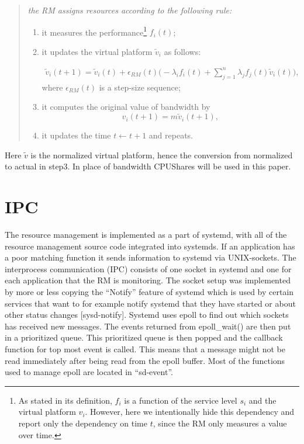 \documentclass[nobiblatex]{LTHthesis}
\begin{document}
\begin{quotation}
\em
	the RM assigns resources according to
	the following rule:
	\begin{enumerate}

	\item it measures the performance\footnote{As stated in its definition, $f_i$ is a function of the service level $s_i$ and the virtual platform $v_i$. However, here we intentionally hide this dependency and report only the dependency on time $t$, since the RM only measures a value over time.} $f_i(t)$;  
	\item it updates the virtual platform $\tilde{v}_{i}$ as follows:

		\begin{multline}
		  \tilde{v}_i(t+1) =\tilde{v}_i(t) + \epsilon_{ RM}(t)\Big(- \lambda_i f_i(t) + \sum_{j=1}^n \lambda_j f_j(t) \tilde{v}_i(t)\Big),
		  \label{eq:RecursionForResources}
		\end{multline}
		  where $\epsilon_{ RM}(t)$ is a step-size sequence;
	\item it computes the original value of bandwidth by $$v_i(t+1) = m \tilde{v}_i(t+1),$$
	\item it updates the time $t\leftarrow t+1$ and repeats.
	\end{enumerate}
	
	
\end{quotation}

Here $\tilde{v}$ is the normalized virtual platform, hence the conversion from normalized to actual in step3. In place of bandwidth CPUShares will be used in this paper.





\section{IPC}
The resource management is implemented as a part of systemd, with all of the resource management source code integrated into systemds. If an application has a poor matching function it sends information to systemd via UNIX-sockets. The interprocess communication (IPC) consists of one socket in systemd and one for each application that the RM is monitoring. The socket setup was implemented by more or less copying the “Notify” feature of systemd which is used by certain services that want to for example notify systemd that they have started or about other status changes [sysd-notify].
Systemd uses epoll to find out which sockets has received new messages. The events returned from epoll\_wait() are then put in a prioritized queue. This prioritized queue is then popped and the callback function for top most event is called. This means that a message might not be read immediately after being read from the epoll buffer. Most of the functions used to manage epoll are located in “sd-event”. 
\end{document}
